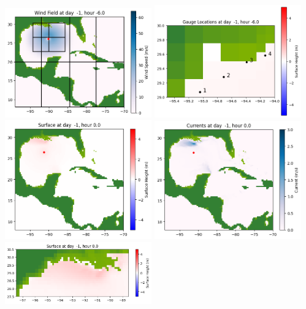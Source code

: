 \documentclass[11pt]{article}
\begin{document}
\vskip 10pt 
\includegraphics[width=0.475\textwidth]{frame0007fig1007.png}
\includegraphics[width=0.475\textwidth]{frame0007fig1008.png}
\vskip 10pt 
\includegraphics[width=0.475\textwidth]{frame0008fig1001.png}
\includegraphics[width=0.475\textwidth]{frame0008fig1002.png}
\vskip 10pt 
\includegraphics[width=0.475\textwidth]{frame0008fig1003.png}
\end{document}
